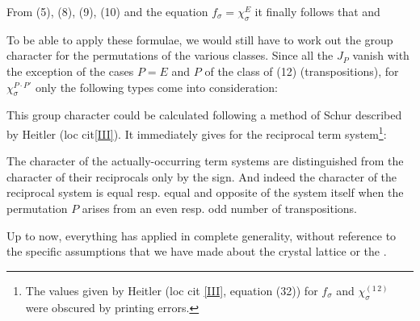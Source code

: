\begin{paper}{1}
From (5), (8), (9), (10) and the equation $f_\sigma = \chi_\sigma^E$ it finally follows that
and

To be able to apply these formulae, we would still have to work out the group character for the permutations of the various classes. Since all the $J_P$ vanish with the exception of the cases $P=E$ and $P$ of the class of (12) (transpositions), for $\chi_\sigma^{P\cdot P'}$ only the following types come into consideration:

This group character could be calculated following a method of Schur described by Heitler (loc cit\ref{III}). It immediately gives for the reciprocal term system\footnote{The values given by Heitler (loc cit \ref{III}, equation (32)) for $f_\sigma$ and $\chi_\sigma^{(1\,2)}$ were obscured by printing errors.}:

The character of the actually-occurring term systems are distinguished from the character of their reciprocals only by the sign. And indeed the character of the reciprocal system is equal resp. equal and opposite of the system itself when the permutation $P$ arises from an even resp. odd number of transpositions.

Up to now, everything has applied in complete generality, without reference to the specific assumptions that we have made about the crystal lattice or the .


\end{paper}
